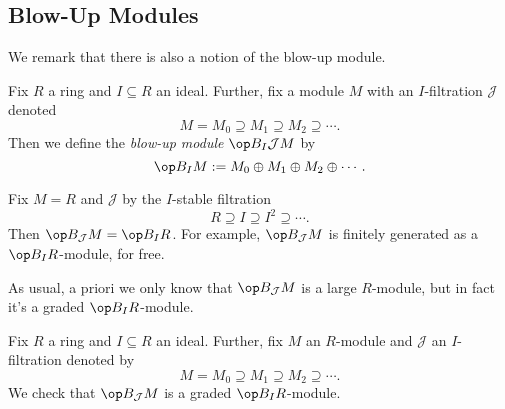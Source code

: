 \subsection{Blow-Up Modules}
We remark that there is also a notion of the blow-up module.
\begin{definition}
	Fix $R$ a ring and $I\subseteq R$ an ideal. Further, fix a module $M$ with an $I$-filtration $\mathcal J$ denoted
	\[M=M_0\supseteq M_1\supseteq M_2\supseteq\cdots.\]
	Then we define the \textit{blow-up module} $\op B_I\mathcal JM$ by
	\[\op B_IM:=M_0\oplus M_1\oplus M_2\oplus\cdots.\]
\end{definition}
\begin{example}
	Fix $M=R$ and $\mathcal J$ by the $I$-stable filtration
	\[R\supseteq I\supseteq I^2\supseteq\cdots.\]
	Then $\op B_\mathcal JM=\op B_IR$. For example, $\op B_\mathcal JM$ is finitely generated as a $\op B_IR$-module, for free.
\end{example}
As usual, a priori we only know that $\op B_\mathcal JM$ is a large $R$-module, but in fact it's a graded $\op B_IR$-module.
\begin{lemma}
	Fix $R$ a ring and $I\subseteq R$ an ideal. Further, fix $M$ an $R$-module and $\mathcal J$ an $I$-filtration denoted by
	\[M=M_0\supseteq M_1\supseteq M_2\supseteq\cdots.\]
	We check that $\op B_\mathcal JM$ is a graded $\op B_IR$-module.
\end{lemma}
